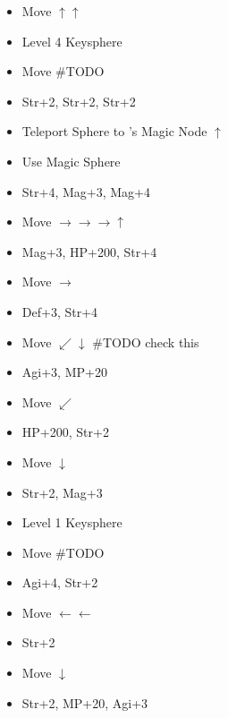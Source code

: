 \begin{spheregrid}
\begin{itemize}
		\begin{itemize}
			\item Move $\uparrow\uparrow$
			\item Level 4 Keysphere
			\item Move \#TODO
			\item Str+2, Str+2, Str+2
			\item Teleport Sphere to \auron's Magic Node $\uparrow$
			\item Use Magic Sphere
			\item Str+4, Mag+3, Mag+4
			\item Move $\rightarrow\rightarrow\rightarrow\uparrow$
			\item Mag+3, HP+200, Str+4
			\item Move $\rightarrow$
			\item Def+3, Str+4
			\item Move $\swarrow\downarrow$ \#TODO check this
			\item Agi+3, MP+20
			\item Move $\swarrow$
			\item HP+200, Str+2
			\item Move $\downarrow$
			\item Str+2, Mag+3
			\item Level 1 Keysphere
			\item Move \#TODO
			\item Agi+4, Str+2
			\item Move $\leftarrow\leftarrow$
			\item Str+2
			\item Move $\downarrow$
			\item Str+2, MP+20, Agi+3
		\end{itemize}
	\end{itemize}
\end{spheregrid}
